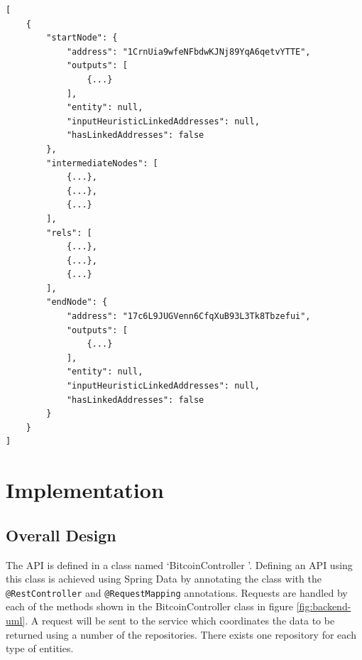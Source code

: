 \begin{lstlisting}[label={lst:path-find-response}, caption={Response to a path find query}, breaklines=true, basicstyle=\small]
[
    {
        "startNode": {
            "address": "1CrnUia9wfeNFbdwKJNj89YqA6qetvYTTE",
            "outputs": [
                {...}
            ],
            "entity": null,
            "inputHeuristicLinkedAddresses": null,
            "hasLinkedAddresses": false
        },
        "intermediateNodes": [
            {...},
            {...},
            {...}
        ],
        "rels": [
            {...},
            {...},
            {...}
        ],
        "endNode": {
            "address": "17c6L9JUGVenn6CfqXuB93L3Tk8Tbzefui",
            "outputs": [
                {...}
            ],
            "entity": null,
            "inputHeuristicLinkedAddresses": null,
            "hasLinkedAddresses": false
        }
    }
]
\end{lstlisting}

\section{Implementation} 
\subsection{Overall Design}
The API is defined in a class named \lq BitcoinController \rq. Defining an API using this class is achieved using Spring Data by annotating the class with the \texttt{@RestController} and \texttt{@RequestMapping} annotations. Requests are handled by each of the methods shown in the BitcoinController class in figure \ref{fig:backend-uml}. A request will be sent to the service which coordinates the data to be returned using a number of the repositories. There exists one repository for each type of entities. 

